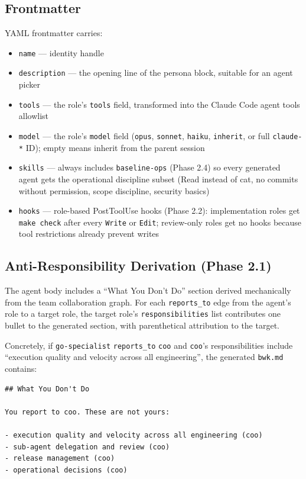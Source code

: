 \documentclass[a4paper,10pt]{article}
\newcommand{\field}[1]{\texttt{#1}}
\begin{document}
\subsection{Frontmatter}

YAML frontmatter carries:

\begin{itemize}
  \item \field{name} --- identity handle
  \item \field{description} --- the opening line of the persona
    block, suitable for an agent picker
  \item \field{tools} --- the role's \field{tools} field, transformed
    into the Claude Code agent tools allowlist
  \item \field{model} --- the role's \field{model} field
    (\texttt{opus}, \texttt{sonnet}, \texttt{haiku},
    \texttt{inherit}, or full \texttt{claude-*} ID); empty means
    inherit from the parent session
  \item \field{skills} --- always includes \texttt{baseline-ops}
    (Phase 2.4) so every generated agent gets the operational
    discipline subset (Read instead of cat, no commits without
    permission, scope discipline, security basics)
  \item \field{hooks} --- role-based PostToolUse hooks (Phase 2.2):
    implementation roles get \texttt{make check} after every
    \texttt{Write} or \texttt{Edit}; review-only roles get no
    hooks because tool restrictions already prevent writes
\end{itemize}

\subsection{Anti-Responsibility Derivation (Phase 2.1)}

The agent body includes a ``What You Don't Do'' section derived
mechanically from the team collaboration graph.  For each
\texttt{reports\_to} edge from the agent's role to a target role,
the target role's \field{responsibilities} list contributes one
bullet to the generated section, with parenthetical attribution to
the target.

Concretely, if \texttt{go-specialist} \texttt{reports\_to}
\texttt{coo} and \texttt{coo}'s responsibilities include
``execution quality and velocity across all engineering'', the
generated \texttt{bwk.md} contains:

\begin{verbatim}
## What You Don't Do

You report to coo. These are not yours:

- execution quality and velocity across all engineering (coo)
- sub-agent delegation and review (coo)
- release management (coo)
- operational decisions (coo)
\end{verbatim}
\end{document}
